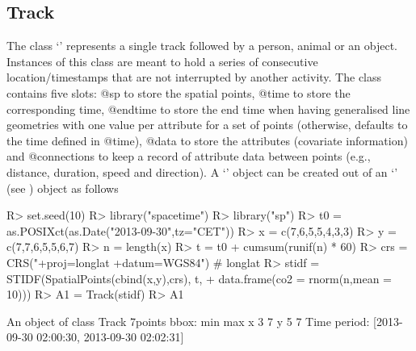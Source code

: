\documentclass[article]{jss}
\newcommand{\class}[1]{`\code{#1}'}
\begin{document}
\subsection{Track}
The class \class{Track} represents a single track followed by a person, animal or an object. Instances of this class are meant to hold a series of consecutive location/timestamps that are not interrupted by another activity. The class contains five slots: @sp to store the spatial points, @time to store the corresponding time, @endtime to store the end time when having generalised line geometries with one value per attribute for a set of points (otherwise, defaults to the time defined in @time), @data to store the attributes (covariate information) and @connections to keep a record of attribute data between points (e.g., distance, duration, speed and direction). A \class{Track} object can be created out of an \class{STIDF} (see \cite{spacetime}) object as follows
\begin{Sinput}
R> set.seed(10)
R> library("spacetime")
R> library("sp")
R> t0 = as.POSIXct(as.Date("2013-09-30",tz="CET"))
R> x = c(7,6,5,5,4,3,3)
R> y = c(7,7,6,5,5,6,7)
R> n = length(x)
R> t = t0 + cumsum(runif(n) * 60)
R> crs = CRS("+proj=longlat +datum=WGS84") # longlat
R> stidf = STIDF(SpatialPoints(cbind(x,y),crs), t, 
+                  data.frame(co2 = rnorm(n,mean = 10)))
R> A1 = Track(stidf)
R> A1
\end{Sinput}
\begin{Soutput}
An object of class Track 
7points 
bbox: 
  min max
x   3   7
y   5   7
Time period: [2013-09-30 02:00:30, 2013-09-30 02:02:31]
\end{Soutput}
\end{document}
